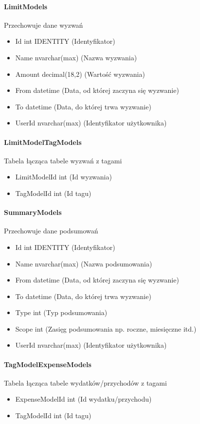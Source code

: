 \documentclass[10pt,titlepage]{article}
\begin{document}
\paragraph[short]{LimitModels}
Przechowuje dane wyzwań
\begin{itemize}
  \item Id int IDENTITY (Identyfikator)
  \item Name nvarchar(max) (Nazwa wyzwania)
  \item Amount decimal(18,2) (Wartość wyzwania)
  \item From datetime (Data, od której zaczyna się wyzwanie)
  \item To datetime (Data, do której trwa wyzwanie)
  \item UserId nvarchar(max) (Identyfikator użytkownika)
\end{itemize}
\paragraph[short]{LimitModelTagModels}
Tabela łącząca tabele wyzwań z tagami
\begin{itemize}
  \item LimitModelId int (Id wyzwania)
  \item TagModelId int (Id tagu)
\end{itemize}
\paragraph[short]{SummaryModels}
Przechowuje dane podsumowań
\begin{itemize}
  \item Id int IDENTITY (Identyfikator)
  \item Name nvarchar(max) (Nazwa podsumowania)
  \item From datetime (Data, od której zaczyna się wyzwanie)
  \item To datetime (Data, do której trwa wyzwanie)
  \item Type int (Typ podsumowania)
  \item Scope int (Zasięg podsumowania np. roczne, miesięczne itd.)
  \item UserId nvarchar(max) (Identyfikator użytkownika)
\end{itemize}
\paragraph[short]{TagModelExpenseModels}
Tabela łącząca tabele wydatków/przychodów z tagami
\begin{itemize}
  \item ExpenseModelId int (Id wydatku/przychodu)
  \item TagModelId int (Id tagu)
\end{itemize}
\end{document}
